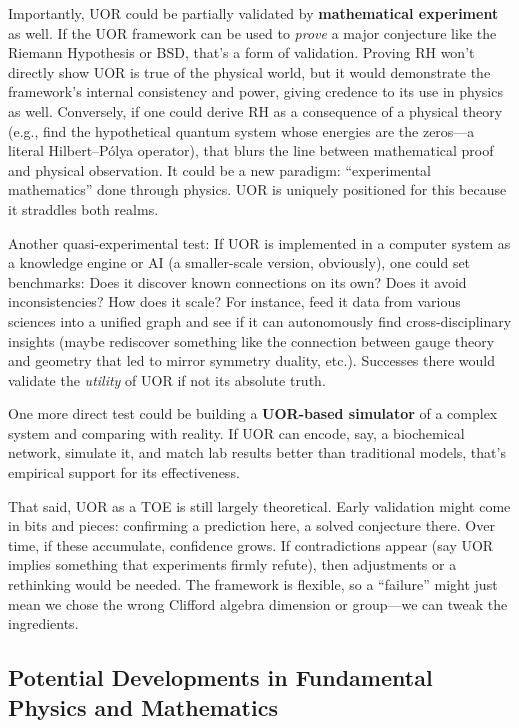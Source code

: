 \documentclass[12pt]{article}
\begin{document}
\medskip

Importantly, UOR could be partially validated by \textbf{mathematical experiment} as well. If the UOR framework can be used to \emph{prove} a major conjecture like the Riemann Hypothesis or BSD, that’s a form of validation. Proving RH won’t directly show UOR is true of the physical world, but it would demonstrate the framework’s internal consistency and power, giving credence to its use in physics as well. Conversely, if one could derive RH as a consequence of a physical theory (e.g., find the hypothetical quantum system whose energies are the zeros---a literal Hilbert--P\'olya operator), that blurs the line between mathematical proof and physical observation. It could be a new paradigm: ``experimental mathematics'' done through physics. UOR is uniquely positioned for this because it straddles both realms.

\medskip

Another quasi-experimental test: If UOR is implemented in a computer system as a knowledge engine or AI (a smaller-scale version, obviously), one could set benchmarks: Does it discover known connections on its own? Does it avoid inconsistencies? How does it scale? For instance, feed it data from various sciences into a unified graph and see if it can autonomously find cross-disciplinary insights (maybe rediscover something like the connection between gauge theory and geometry that led to mirror symmetry duality, etc.). Successes there would validate the \emph{utility} of UOR if not its absolute truth.

\medskip

One more direct test could be building a \textbf{UOR-based simulator} of a complex system and comparing with reality. If UOR can encode, say, a biochemical network, simulate it, and match lab results better than traditional models, that’s empirical support for its effectiveness.

\medskip

That said, UOR as a TOE is still largely theoretical. Early validation might come in bits and pieces: confirming a prediction here, a solved conjecture there. Over time, if these accumulate, confidence grows. If contradictions appear (say UOR implies something that experiments firmly refute), then adjustments or a rethinking would be needed. The framework is flexible, so a ``failure'' might just mean we chose the wrong Clifford algebra dimension or group---we can tweak the ingredients.

\subsection{Potential Developments in Fundamental Physics and Mathematics}
\end{document}
